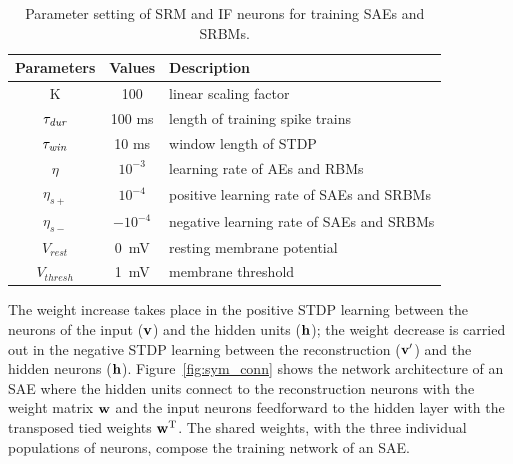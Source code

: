 \DIFaddend \begin{table}[th]
	\centering
	\caption{\label{tbl:srm}Parameter setting of SRM and IF neurons for training SAEs and SRBMs.}
	\bgroup
	\def\arraystretch{1.2}
	\begin{tabular}{c c l}
		Parameters & Values & Description \\
		\hline
		K & 100 & linear scaling factor\\
		$\tau_{\textit{\textrm{dur}}}$ & 100 ms &  length of training spike trains\\
		$\tau_{\textit{\textrm{win}}}$ & 10 ms & window length of STDP\\
		$\eta$ & $10^{-3}$ & learning rate of AEs and RBMs\\
		$\eta_{s+}$ & $10^{-4}$ & positive learning rate of SAEs and SRBMs\\
		$\eta_{s-}$ & $-10^{-4}$ & negative learning rate of SAEs and SRBMs\\
		$V_{rest}$ & 0~mV & resting membrane potential\\
		$V_{thresh}$ & 1~mV & membrane threshold  \\
	\end{tabular}
	\egroup
\end{table}

The weight increase takes place in the positive STDP learning between the neurons of the input ($\bf{v}$) and the hidden units ($\bf{h}$); 
the weight decrease is carried out in the negative STDP learning between the reconstruction ($\bf{v'}$) and the hidden neurons ($\bf{h}$).
Figure~\ref{fig:sym_conn} shows the network architecture of an SAE where the hidden units connect to the reconstruction neurons with the weight matrix $\bf{w}$ and the input neurons feedforward to the hidden layer with the transposed tied weights $\bf{w}^\textrm{T}$.
The shared weights, with the three individual populations of neurons, compose the training network of an SAE\DIFaddbegin {}\DIFaddend .

